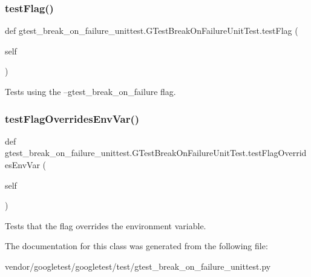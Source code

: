 \subsubsection{\texorpdfstring{test\+Flag()}{testFlag()}}
{\footnotesize\ttfamily def gtest\+\_\+break\+\_\+on\+\_\+failure\+\_\+unittest.\+G\+Test\+Break\+On\+Failure\+Unit\+Test.\+test\+Flag (\begin{DoxyParamCaption}\item[{}]{self }\end{DoxyParamCaption})}

\begin{DoxyVerb}Tests using the --gtest_break_on_failure flag.\end{DoxyVerb}
 \mbox{\label{classgtest__break__on__failure__unittest_1_1_g_test_break_on_failure_unit_test_a15836ddb27e51e9aaf2f8aad84f5cef7}} 
\subsubsection{\texorpdfstring{test\+Flag\+Overrides\+Env\+Var()}{testFlagOverridesEnvVar()}}
{\footnotesize\ttfamily def gtest\+\_\+break\+\_\+on\+\_\+failure\+\_\+unittest.\+G\+Test\+Break\+On\+Failure\+Unit\+Test.\+test\+Flag\+Overrides\+Env\+Var (\begin{DoxyParamCaption}\item[{}]{self }\end{DoxyParamCaption})}

\begin{DoxyVerb}Tests that the flag overrides the environment variable.\end{DoxyVerb}
 

The documentation for this class was generated from the following file\+:\begin{DoxyCompactItemize}
\item 
vendor/googletest/googletest/test/gtest\+\_\+break\+\_\+on\+\_\+failure\+\_\+unittest.\+py\end{DoxyCompactItemize}
